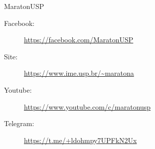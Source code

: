 \begin{subsecao}{MaratonUSP}
\begin{description}
\item[Facebook:] \url{https://facebook.com/MaratonUSP}
\item[Site:] \url{https://www.ime.usp.br/~maratona}
\item[Youtube:] \url{https://www.youtube.com/c/maratonusp}
\item[Telegram:] \url{https://t.me/+ldohmpy7UPFkN2Ux}
\end{description}

\end{subsecao}
